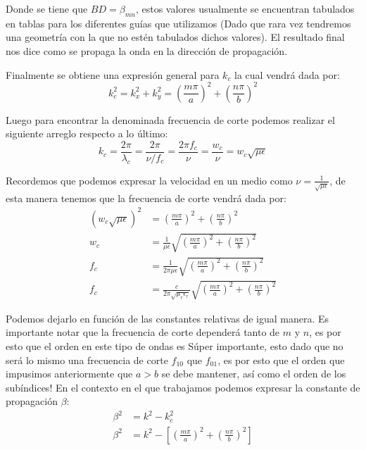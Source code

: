 \documentclass[
  11pt,
  letterpaper,
   addpoints,
   answers
  ]{exam}
\begin{document}
\begin{questions}
\begin{solution}
Donde se tiene que $BD = \beta_{mn}$, estos valores usualmente se encuentran tabulados en tablas para los diferentes guías que utilizamos (Dado que rara vez tendremos una geometría con la que no estén tabulados dichos valores). El resultado final nos dice como se propaga la onda en la dirección de propagación.

Finalmente se obtiene una expresión general para $k_c$ la cual vendrá dada por:
\begin{equation}
    k_c^2 = k_x^2 + k_y^2 = \left(\frac{m\pi}{a}\right)^2 + \left(\frac{n\pi}{b}\right)^2 \tag{54}
\end{equation}

Luego para encontrar la denominada frecuencia de corte podemos realizar el siguiente arreglo respecto a lo último:
\begin{equation}
    k_c = \frac{2\pi}{\lambda_c} = \frac{2\pi}{\nu / f_c} = \frac{2\pi f_c}{\nu} = \frac{w_c}{\nu} = w_c \sqrt{\mu\epsilon}
\end{equation}

Recordemos que podemos expresar la velocidad en un medio como $\nu = \frac{1}{\sqrt{\mu\epsilon}}$, de esta manera tenemos que la frecuencia de corte vendrá dada por:
\begin{align}
    (w_c \sqrt{\mu\epsilon})^2 &= \left( \frac{m\pi}{a} \right)^2 + \left( \frac{n\pi}{b} \right)^2 \tag{56} \\
    w_c &= \frac{1}{\mu\epsilon} \sqrt{\left( \frac{m\pi}{a} \right)^2 + \left( \frac{n\pi}{b} \right)^2} \tag{57} \\
    f_c &= \frac{1}{2\pi\mu\epsilon} \sqrt{\left( \frac{m\pi}{a} \right)^2 + \left( \frac{n\pi}{b} \right)^2} \tag{58} \\
    f_c &= \frac{c}{2\pi \sqrt{\mu_r \epsilon_r}} \sqrt{\left( \frac{m\pi}{a} \right)^2 + \left( \frac{n\pi}{b} \right)^2} \tag{59}
\end{align}

Podemos dejarlo en función de las constantes relativas de igual manera. Es importante notar que la frecuencia de corte dependerá tanto de $m$ y $n$, es por esto que el orden en este tipo de ondas es Súper importante, esto dado que no será lo mismo una frecuencia de corte $f_{10}$ que $f_{01}$, es por esto que el orden que impusimos anteriormente que $a > b$ se debe mantener, así como el orden de los subíndices! En el contexto en el que trabajamos podemos expresar la constante de propagación $\beta$:
\begin{align}
    \beta^2 &= k^2 - k_c^2 \tag{60} \\
    \beta^2 &= k^2 - \left[ \left( \frac{m\pi}{a} \right)^2 + \left( \frac{n\pi}{b} \right)^2 \right] \tag{61}
\end{align}


\end{solution}
\end{questions}
\end{document}
